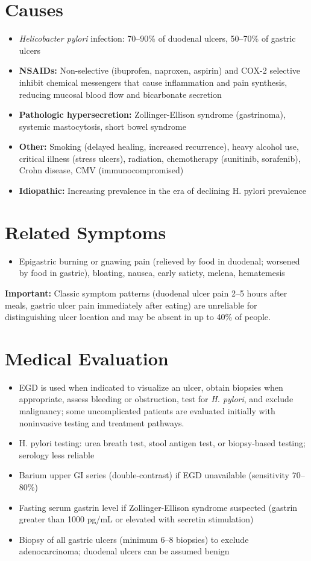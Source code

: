 \section*{Causes}
\begin{itemize}
  \item \textit{Helicobacter pylori} infection: 70--90\% of duodenal ulcers, 50--70\% of gastric ulcers
  \item \textbf{NSAIDs:} Non-selective (ibuprofen, naproxen, aspirin) and COX-2 selective inhibit chemical messengers that cause inflammation and pain synthesis, reducing mucosal blood flow and bicarbonate secretion
  \item \textbf{Pathologic hypersecretion:} Zollinger-Ellison syndrome (gastrinoma), systemic mastocytosis, short bowel syndrome
  \item \textbf{Other:} Smoking (delayed healing, increased recurrence), heavy alcohol use, critical illness (stress ulcers), radiation, chemotherapy (sunitinib, sorafenib), Crohn disease, CMV (immunocompromised)
  \item \textbf{Idiopathic:} Increasing prevalence in the era of declining H. pylori prevalence
\end{itemize}

\section*{Related Symptoms}
\begin{itemize}
  \item Epigastric burning or gnawing pain (relieved by food in duodenal; worsened by food in gastric), bloating, nausea, early satiety, melena, hematemesis
\end{itemize}
\textbf{Important:} Classic symptom patterns (duodenal ulcer pain 2--5 hours after meals, gastric ulcer pain immediately after eating) are unreliable for distinguishing ulcer location and may be absent in up to 40\% of people.

\section*{Medical Evaluation}
\begin{itemize}
  \item EGD is used when indicated to visualize an ulcer, obtain biopsies when appropriate, assess bleeding or obstruction, test for \textit{H. pylori}, and exclude malignancy; some uncomplicated patients are evaluated initially with noninvasive testing and treatment pathways.
  \item H. pylori testing: urea breath test, stool antigen test, or biopsy-based testing; serology less reliable
  \item Barium upper GI series (double-contrast) if EGD unavailable (sensitivity 70--80\%)
  \item Fasting serum gastrin level if Zollinger-Ellison syndrome suspected (gastrin greater than 1000 pg/mL or elevated with secretin stimulation)
  \item Biopsy of all gastric ulcers (minimum 6--8 biopsies) to exclude adenocarcinoma; duodenal ulcers can be assumed benign
\end{itemize}

